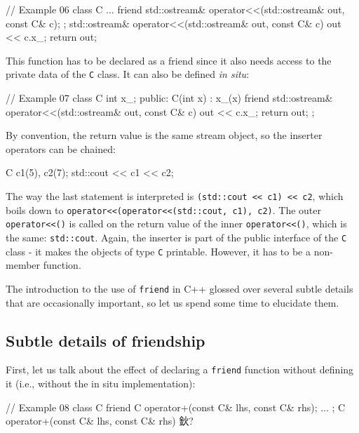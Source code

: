 \begin{code}
// Example 06
class C {
  ...
  friend std::ostream& operator<<(std::ostream& out,
                                  const C& c);
};
std::ostream& operator<<(std::ostream& out, const C& c) {
  out << c.x_;
  return out;
}
\end{code}

This function has to be declared as a friend since it also needs access to the private data of the \texttt{C} class. It can also be defined \emph{in situ}:

\begin{code}
// Example 07
class C {
  int x_;
  public:
  C(int x) : x_(x) {}
  friend std::ostream& operator<<(std::ostream& out,
                                  const C& c) {
    out << c.x_;
    return out;
  }
};
\end{code}

By convention, the return value is the same stream object, so the inserter operators can be chained:

\begin{code}
C c1(5), c2(7);
std::cout << c1 << c2;
\end{code}

The way the last statement is interpreted is \texttt{(std::cout\ \textless{}\textless{}\ c1)\ \textless{}\textless{}\ c2}, which boils down to \texttt{operator\textless{}\textless{}(operator\textless{}\textless{}(std::cout,\ c1),\ c2)}. The outer \texttt{operator\textless{}\textless{}()} is called on the return value of the inner \texttt{operator\textless{}\textless{}()}, which is the same: \texttt{std::cout}. Again, the inserter is part of the public interface of the \texttt{C} class - it makes the objects of type \texttt{C} printable. However, it has to be a non-member function.

The introduction to the use of \texttt{friend} in C++ glossed over several subtle details that are occasionally important, so let us spend some time to elucidate them.

\subsection{Subtle details of friendship}

First, let us talk about the effect of declaring a \texttt{friend} function without defining it (i.e., without the in situ implementation):

\begin{code}
// Example 08
class C {
  friend C operator+(const C& lhs, const C& rhs);
  ...
};
C operator+(const C& lhs, const C& rhs) { 鈥?}
\end{code}

